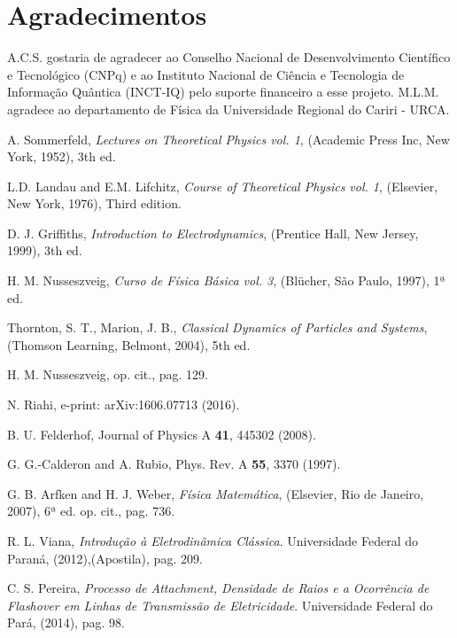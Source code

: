 \documentclass[twocolumn]{rbef}
\newcommand{\1}{\mathbbm{1}}
\begin{document}
\section*{Agradecimentos}

A.C.S. gostaria de agradecer ao Conselho Nacional de Desenvolvimento
Científico e Tecnológico (CNPq) e ao Instituto Nacional de Ciência e
Tecnologia de Informação Quântica (INCT-IQ) pelo suporte financeiro a
esse projeto. M.L.M. agradece ao departamento de Física da Universidade
Regional do Cariri - URCA.

\begin{thebibliography}{99}
  

 A. Sommerfeld, \textit{Lectures on Theoretical
    Physics vol. 1}, (Academic Press Inc, New York, 1952), 3th ed.

 L.D. Landau and E.M. Lifchitz, \textit{Course of
    Theoretical Physics vol. 1}, (Elsevier, New York, 1976), Third
  edition.

 D. J. Griffiths, \textit{Introduction to
    Electrodynamics}, (Prentice Hall, New Jersey, 1999), 3th ed.

 H. M. Nusseszveig, \textit{Curso de Física Básica
    vol. 3}, (Blücher, São Paulo, 1997), 1ª ed.

 Thornton, S. T., Marion, J. B., \textit{Classical
    Dynamics of Particles and Systems}, (Thomson Learning, Belmont,
  2004), 5th ed.

 H. M. Nusseszveig, op. cit., pag. 129.

 {N. Riahi}, e-print: arXiv:1606.07713 (2016).

 B. U. Felderhof, Journal of Physics A
  \textbf{41}, 445302 (2008).

 G. G.-Calderon and A. Rubio, Phys. Rev. A
  \textbf{55}, 3370 (1997).

 G. B. Arfken and H. J. Weber, \textit{Física
    Matemática}, (Elsevier, Rio de Janeiro, 2007), 6ª ed. op. cit.,
  pag. 736.

 R. L. Viana, \textit{Introdução à Eletrodinâmica
    Clássica}. Universidade Federal do Paraná, (2012),(Apostila),
  pag. 209.

 C. S. Pereira, \textit{Processo de Attachment,
    Densidade de Raios e a Ocorrência de Flashover em Linhas de
    Transmissão de Eletricidade}. Universidade Federal do Pará, (2014),
  pag. 98.


\end{thebibliography}
\end{document}

